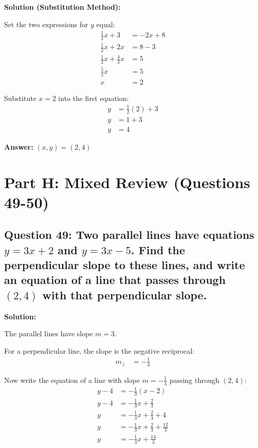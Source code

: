 \documentclass[12pt]{article}
\begin{document}
\noindent\textbf{Solution (Substitution Method):}

Set the two expressions for $y$ equal:
\begin{align*}
\frac{1}{2}x + 3 &= -2x + 8 \\
\frac{1}{2}x + 2x &= 8 - 3 \\
\frac{1}{2}x + \frac{4}{2}x &= 5 \\
\frac{5}{2}x &= 5 \\
x &= 2
\end{align*}

Substitute $x = 2$ into the first equation:
\begin{align*}
y &= \frac{1}{2}(2) + 3 \\
y &= 1 + 3 \\
y &= 4
\end{align*}

\textbf{Answer: } $(x, y) = (2, 4)$

\newpage

\section{Part H: Mixed Review (Questions 49-50)}

\subsection*{Question 49: Two parallel lines have equations $y = 3x + 2$ and $y = 3x - 5$. Find the perpendicular slope to these lines, and write an equation of a line that passes through $(2, 4)$ with that perpendicular slope.}

\noindent\textbf{Solution:}

The parallel lines have slope $m = 3$.

For a perpendicular line, the slope is the negative reciprocal:
\begin{align*}
m_{\perp} &= -\frac{1}{3}
\end{align*}

Now write the equation of a line with slope $m = -\frac{1}{3}$ passing through $(2, 4)$:
\begin{align*}
y - 4 &= -\frac{1}{3}(x - 2) \\
y - 4 &= -\frac{1}{3}x + \frac{2}{3} \\
y &= -\frac{1}{3}x + \frac{2}{3} + 4 \\
y &= -\frac{1}{3}x + \frac{2}{3} + \frac{12}{3} \\
y &= -\frac{1}{3}x + \frac{14}{3}
\end{align*}
\end{document}
